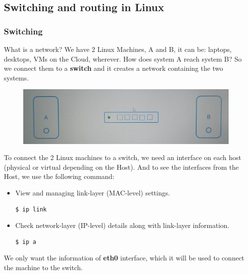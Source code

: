 \documentclass{article}
\newenvironment{codetemplate}[1][]{%
  \mybasecolorbox[#1]
  \itshape
}{%
  \endmybasecolorbox
}
\begin{document}
\subsection{Switching and routing in Linux}
\label{swrt}

\subsubsection{Switching}

What is a network? We have 2 Linux Machines, A and B, it can be: laptops, desktops, VMs on the Cloud, wherever. How does system A reach system B? So we connect them to a \textbf{switch} and it creates a network containing the two systems. 

\begin{figure}[H]
    \includegraphics[width=\textwidth]{pictures/ntw.jpg}
\end{figure}

To connect the 2 Linux machines to a switch, we need an interface on each host (physical or virtual depending on the Host). And to see the interfaces from the Host, we use the following command:

\begin{itemize}
    \item View and managing link-layer (MAC-level) settings.
\begin{codetemplate}{}
\begin{verbatim}
$ ip link
\end{verbatim}
\end{codetemplate}

    \item Check network-layer (IP-level) details along with link-layer information.
\begin{codetemplate}{}
\begin{verbatim}
$ ip a
\end{verbatim}
\end{codetemplate}
\end{itemize}

We only want the information of \textbf{eth0} interface, which it will be used to connect the machine to the switch. 
\end{document}
